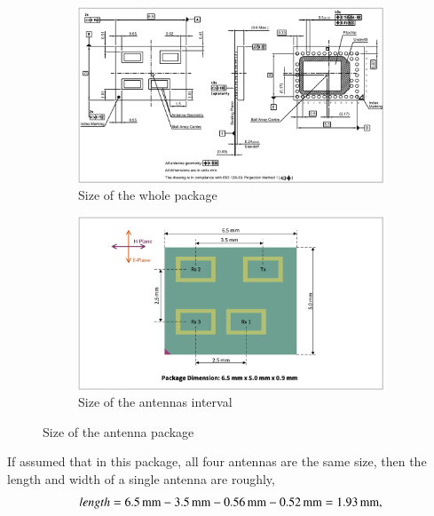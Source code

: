 \documentclass[12pt,DIV14,BCOR12mm,a4paper,footinclude=false,headinclude,parskip=half-,twoside,openright,cleardoublepage=empty,toc=index,bibliography=totoc,listof=totoc]{scrreprt}
\numberwithin{equation}{chapter}
\begin{document}
\begin{figure}[!htb]
    \centering
    \begin{subfigure}[b]{\textwidth}
        \centering
        \includegraphics[scale=.48]{figures/size_of_package.png}
        \caption{Size of the whole package}
        \label{size of the whole package}
    \end{subfigure}
    
    \begin{subfigure}[b]{\textwidth}
        \centering
        \includegraphics[scale=.48]{figures/size_of_antenna_interval.png}
        \caption{Size of the antennas interval}
        \label{size of the antennas interval}
    \end{subfigure}
    
    \caption{Size of the antenna package \cite{datasheet}}
    \label{size of the antenna package}
\end{figure}

If assumed that in this package, all four antennas are the same size, then the length and width of a single antenna are roughly,
\begin{equation}
    \centering
    length = 6.5\,\mathrm{mm} - 3.5\,\mathrm{mm} - 0.56\,\mathrm{mm} - 0.52\,\mathrm{mm} = 1.93\,\mathrm{mm},
\end{equation}
\end{document}
